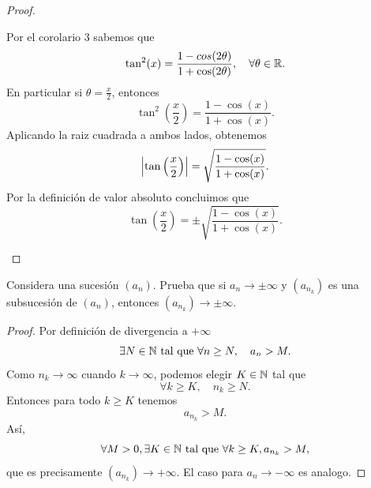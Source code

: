 \documentclass[12pt,a4paper]{article}
\newcommand{\paren}[1]{\left( #1 \right)}
\begin{document}
\begin{proof}
\begin{enumerate}
            Por el corolario 3 sabemos que
            \begin{equation*}
                \tan^{2}(x)=\frac{1-cos(2\theta)}{1+\cos(2\theta)},\quad\forall\theta\in\mathbb{R}.
            \end{equation*}
            En particular si $\theta=\frac{x}{2}$, entonces
            \begin{equation*}
                \tan^{2}\paren{\frac{x}{2}}=\frac{1-\cos(x)}{1+\cos(x)}.
            \end{equation*}
            Aplicando la raiz cuadrada a ambos lados, obtenemos
            \begin{equation*}
                \abs{\tan\paren{\frac{x}{2}}}=\sqrt{\frac{1-\cos(x)}{1+\cos(x)}}.
            \end{equation*}
            Por la definición de valor absoluto concluimos que
            \begin{equation*}
                \tan\paren{\frac{x}{2}}=\pm\sqrt{\frac{1-\cos(x)}{1+\cos(x)}}.
            \end{equation*}
        \end{enumerate}
    \end{proof}

    \begin{mdframed}[style=mdpinkbox,frametitle={Ejercicio 2}]
        Considera una sucesión $(a_{n})$. Prueba que si $a_{n}\to\pm\infty$ y $(a_{n_{k}})$
        es una subsucesión de $(a_{n})$, entonces $(a_{n_{k}})\to\pm\infty$.
    \end{mdframed}

    \begin{proof}
        Por definición de divergencia a $+\infty$
        \begin{equation*}
            \exists N\in\mathbb{N}\text{ tal que }\forall n\geq N,\quad a_{n}> M.
        \end{equation*}
        Como $n_{k}\to\infty$ cuando $k\to\infty$, podemos elegir $K\in\mathbb{N}$ tal que
        \begin{equation*}
            \forall k\geq K,\quad n_{k}\geq N.
        \end{equation*}
        Entonces para todo $k\geq K$ tenemos
        \begin{equation*}
            a_{n_{k}}\gt M.
        \end{equation*}
        Así,
        \begin{equation*}
            \forall M>0,\exists K\in\mathbb{N}\text{ tal que }\forall k\geq K, a_{n_{k}}> M,
        \end{equation*}
        que es precisamente $(a_{n_{k}})\to+\infty$. El caso para $a_{n}\to-\infty$ es analogo.
    \end{proof}
\end{document}
